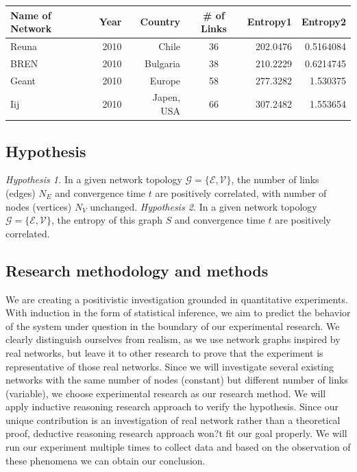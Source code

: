 \documentclass[11pt,a4paper]{article}
\begin{document}
\begin{table}
\centering
\begin{tabular}{lrrcrr}
	\hline
	Name of Network & Year & Country & \# of Links & Entropy1 & Entropy2\\
    \hline
    Reuna & 2010 & Chile & 36 & 202.0476 & 0.5164084\\
    BREN & 2010 & Bulgaria & 38 & 210.2229 & 0.6214745\\
    Geant & 2010 & Europe & 58 & 277.3282 & 1.530375\\
    Iij & 2010 & Japen, USA & 66 & 307.2482 & 1.553654\\
    \hline
\end{tabular}
\label{table: network}
\end{table}

\subsection{Hypothesis}
{\it Hypothesis 1.} In a given network topology $\mathcal{G}=\{\mathcal{E}, \mathcal{V}\}$, the number of links (edges) $N_E$ and convergence time $t$ are positively correlated, with number of nodes (vertices) $N_V$ unchanged.
{\it Hypothesis 2.} In a given network topology $\mathcal{G}=\{\mathcal{E}, \mathcal{V}\}$, the entropy of this graph $S$ and convergence time $t$ are positively correlated.

\subsection{Research methodology and methods}
We are creating a positivistic investigation grounded in quantitative experiments. With induction in the form of statistical inference, we aim to predict the behavior of the system under question in the boundary of our experimental research.
We clearly distinguish ourselves from realism, as we use network graphs inspired by real networks, but leave it to other research to prove that the experiment is representative of those real networks.
Since we will investigate several existing networks with the same number of nodes (constant) but different number of links (variable), we choose experimental research as our research method.
We will apply inductive reasoning research approach to verify the hypothesis. Since our unique contribution is an investigation of real network rather than a theoretical proof, deductive reasoning research approach won?t fit our goal properly. We will run our experiment multiple times to collect data and based on the observation of these phenomena we can obtain our conclusion.
\end{document}
